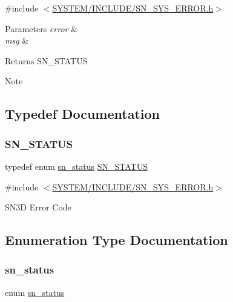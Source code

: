 {\ttfamily \#include $<$\hyperlink{SN__SYS__ERROR_8h}{S\+Y\+S\+T\+E\+M/\+I\+N\+C\+L\+U\+D\+E/\+S\+N\+\_\+\+S\+Y\+S\+\_\+\+E\+R\+R\+O\+R.\+h}$>$}


\begin{DoxyParams}{Parameters}
{\em error} & \\
\hline
{\em msg} & \\
\hline
\end{DoxyParams}
\begin{DoxyReturn}{Returns}
S\+N\+\_\+\+S\+T\+A\+T\+US 
\end{DoxyReturn}
\begin{DoxyNote}{Note}

\end{DoxyNote}


\subsection{Typedef Documentation}
\mbox{\label{group__SYSTEM__ERROR_ga4540713b9a7a18ce44d78c3a10f7442f}} 
\subsubsection{\texorpdfstring{S\+N\+\_\+\+S\+T\+A\+T\+US}{SN\_STATUS}}
{\footnotesize\ttfamily typedef enum \hyperlink{group__SYSTEM__ERROR_ga8cb157fafd64d5b57cdc905615978e99}{sn\+\_\+status}  \hyperlink{group__SYSTEM__ERROR_ga4540713b9a7a18ce44d78c3a10f7442f}{S\+N\+\_\+\+S\+T\+A\+T\+US}}



{\ttfamily \#include $<$\hyperlink{SN__SYS__ERROR_8h}{S\+Y\+S\+T\+E\+M/\+I\+N\+C\+L\+U\+D\+E/\+S\+N\+\_\+\+S\+Y\+S\+\_\+\+E\+R\+R\+O\+R.\+h}$>$}

S\+N3D Error Code 

\subsection{Enumeration Type Documentation}
\mbox{\label{group__SYSTEM__ERROR_ga8cb157fafd64d5b57cdc905615978e99}} 
\subsubsection{\texorpdfstring{sn\+\_\+status}{sn\_status}}
{\footnotesize\ttfamily enum \hyperlink{group__SYSTEM__ERROR_ga8cb157fafd64d5b57cdc905615978e99}{sn\+\_\+status}}



